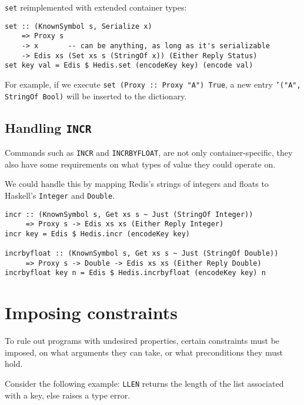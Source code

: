 \documentclass[pldi]{sigplanconf-pldi16}
\begin{document}
\texttt{set} reimplemented with extended container types:

\begin{verbatim}
set :: (KnownSymbol s, Serialize x)
    => Proxy s
    -> x       -- can be anything, as long as it's serializable
    -> Edis xs (Set xs s (StringOf x)) (Either Reply Status)
set key val = Edis $ Hedis.set (encodeKey key) (encode val)
\end{verbatim}

For example, if we execute \texttt{set (Proxy :: Proxy "A") True},
 a new entry \texttt{'}\texttt{("A", StringOf Bool)} will
 be inserted to the dictionary.

\subsection{Handling \texttt{INCR}}

Commands such as \texttt{INCR} and \texttt{INCRBYFLOAT}, are
 not only container-specific, they also have some requirements on what types of
 value they could operate on.

We could handle this by mapping Redis's strings of integers and floats to
 Haskell's \texttt{Integer} and \texttt{Double}.

\begin{verbatim}
incr :: (KnownSymbol s, Get xs s ~ Just (StringOf Integer))
     => Proxy s -> Edis xs xs (Either Reply Integer)
incr key = Edis $ Hedis.incr (encodeKey key)

incrbyfloat :: (KnownSymbol s, Get xs s ~ Just (StringOf Double))
     => Proxy s -> Double -> Edis xs xs (Either Reply Double)
incrbyfloat key n = Edis $ Hedis.incrbyfloat (encodeKey key) n
\end{verbatim}

\section{Imposing constraints}

To rule out programs with undesired properties, certain constraints must be
 imposed, on what arguments they can take, or what preconditions they must hold.

Consider the following example: \texttt{LLEN} returns the length of
 the list associated with a key, else raises a type error.
\end{document}
